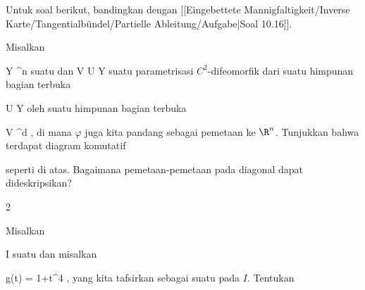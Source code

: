 Untuk soal berikut, bandingkan dengan
[[Eingebettete Mannigfaltigkeit/Inverse Karte/Tangentialbündel/Partielle Ableitung/Aufgabe|Soal 10.16]].

{}
{

Misalkan

\mavergleichskette
{\vergleichskette
{ Y
}
{ \subseteq }{ \R^n
}
{  }{
}
{    }{
}
{   }{
}
}
{}{}{}
suatu
dan
\maabb {\varphi} { V } { U \subseteq Y
} {}
suatu parametrisasi $C^2$-difeomorfik dari suatu himpunan bagian terbuka

\mavergleichskette
{\vergleichskette
{ U
}
{ \subseteq }{ Y
}
{  }{
}
{    }{
}
{   }{
}
}
{}{}{}
oleh suatu himpunan bagian terbuka

\mavergleichskette
{\vergleichskette
{ V
}
{ \subseteq }{ \R^d
}
{  }{
}
{    }{
}
{   }{
}
}
{}{}{,}
di mana $\varphi$ juga kita pandang sebagai pemetaan ke $\R^n$. Tunjukkan bahwa terdapat diagram komutatif

 {  }

seperti di atas. Bagaimana pemetaan-pemetaan pada diagonal dapat dideskripsikan?

}
{} {}


{2}
{

Misalkan

\mavergleichskette
{\vergleichskette
{ I
}
{ \subseteq }{ \R
}
{  }{
}
{    }{
}
{   }{
}
}
{}{}{}
suatu
dan misalkan

\mavergleichskettedisp
{\vergleichskette
{ g(t)
}
{ =} { 1+t^4
}
{ } {
}
{ } {
}
{ } {
}
}
{}{}{,}
yang kita tafsirkan sebagai suatu
pada $I$. Tentukan
 {} {}


}
{} {}

